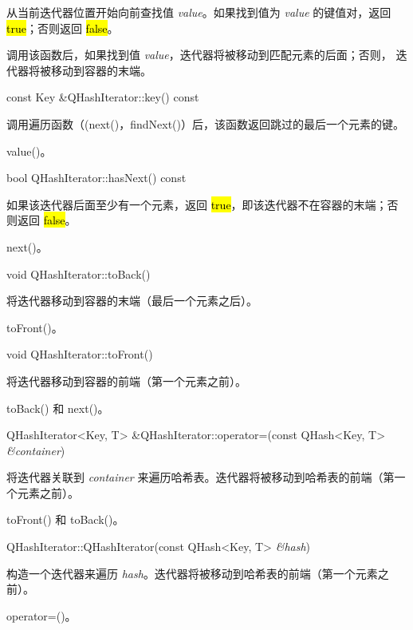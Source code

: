 从当前迭代器位置开始向前查找值 \emph{value}。如果找到值为 \emph{value} 的键值对，返回 \hl{true}；否则返回 \hl{false}。

调用该函数后，如果找到值 \emph{value}，迭代器将被移动到匹配元素的后面；否则，
迭代器将被移动到容器的末端。

const Key \&QHashIterator::key() const

调用遍历函数（(next()，findNext()）后，该函数返回跳过的最后一个元素的键。

\begin{seeAlso}
value()。
\end{seeAlso}

bool QHashIterator::hasNext() const

如果该迭代器后面至少有一个元素，返回 \hl{true}，即该迭代器不在容器的末端；否则返回 \hl{false}。


\begin{seeAlso}
next()。
\end{seeAlso}


void QHashIterator::toBack()

将迭代器移动到容器的末端（最后一个元素之后）。



\begin{seeAlso}
toFront()。
\end{seeAlso}


void QHashIterator::toFront()

将迭代器移动到容器的前端（第一个元素之前）。




\begin{seeAlso}
toBack() 和 next()。
\end{seeAlso}


QHashIterator<Key, T> \&QHashIterator::operator=(const QHash<Key, T> \emph{\&container})

将迭代器关联到 \emph{container} 来遍历哈希表。迭代器将被移动到哈希表的前端（第一个元素之前）。



\begin{seeAlso}
toFront() 和 toBack()。
\end{seeAlso}


QHashIterator::QHashIterator(const QHash<Key, T> \emph{\&hash})

构造一个迭代器来遍历 \emph{hash}。迭代器将被移动到哈希表的前端（第一个元素之前）。


\begin{seeAlso}
operator=()。
\end{seeAlso}


